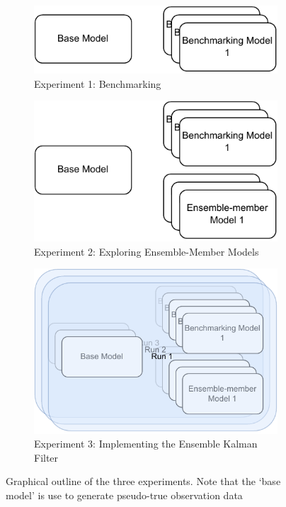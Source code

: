 \documentclass{article}
\begin{document}
\begin{figure}[htp]
    \centering
    \begin{subfigure}[htb]{0.49\textwidth}
        \centering
        \includegraphics[width=\textwidth ]{figures/exp_1}
        \caption{Experiment 1: Benchmarking}\label{fig:exp:exp_1}
    \end{subfigure}
    \hfill  
    \begin{subfigure}[htb]{0.49\textwidth}
        \centering
        \includegraphics[width=\textwidth]{figures/exp_2}
        \caption{Experiment 2: Exploring Ensemble-Member Models}\label{fig:exp:exp_2}
    \end{subfigure}
    
    \vspace{2em}
    
    \begin{subfigure}[htb]{0.50\textwidth}
        \centering
        \includegraphics[width=\textwidth]{figures/exp_3}
        \caption{Experiment 3: Implementing the Ensemble Kalman
        Filter}\label{fig:exp:exp_3}
    \end{subfigure}
    \caption{Graphical outline of the three experiments. Note that the `base model' is use to generate pseudo-true observation data }\label{fig:exp}
\end{figure}
\end{document}

